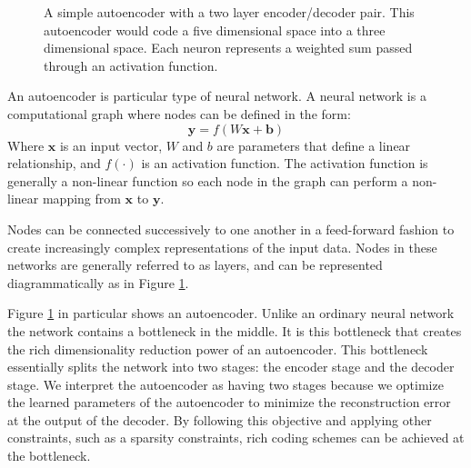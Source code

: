 \begin{figure}
\centering
%
\caption{
A simple autoencoder with a two layer encoder/decoder pair. This autoencoder
would code a five dimensional space into a three dimensional space. Each neuron represents a weighted sum passed through an activation function.
}
\label{autoenc}
\end{figure}

An autoencoder is particular type of neural network. A neural network is a computational graph where nodes can be
defined in the form: 
\begin{equation}
\mathbf{y} = f\left(W\mathbf{x} + \mathbf{b}\right)
\label{dense}
\end{equation}
Where $\mathbf{x}$ is an input vector, $W$ and $b$ are parameters that define a
linear relationship, and $f(\cdot)$ is an activation function. The activation
function is generally a non-linear function so each node in the graph can
perform a non-linear mapping from $\mathbf{x}$ to $\mathbf{y}$.

Nodes can be connected successively to one another in a feed-forward fashion to
create increasingly complex representations of the input data. Nodes in these
networks are generally referred to as layers, and can be represented
diagrammatically as in Figure \ref{autoenc}. 

Figure \ref{autoenc} in particular shows an autoencoder. Unlike an ordinary
neural network the network contains a bottleneck in the middle. It is this
bottleneck that creates the rich dimensionality reduction power of an
autoencoder. This bottleneck essentially splits the network into two stages:
the encoder stage and the decoder stage. We interpret the autoencoder as
having two stages because we optimize the learned parameters of the
autoencoder to minimize the reconstruction error at the output of the decoder.
By following this objective and applying other constraints, such as a sparsity constraints, rich coding schemes can be achieved at the bottleneck.
